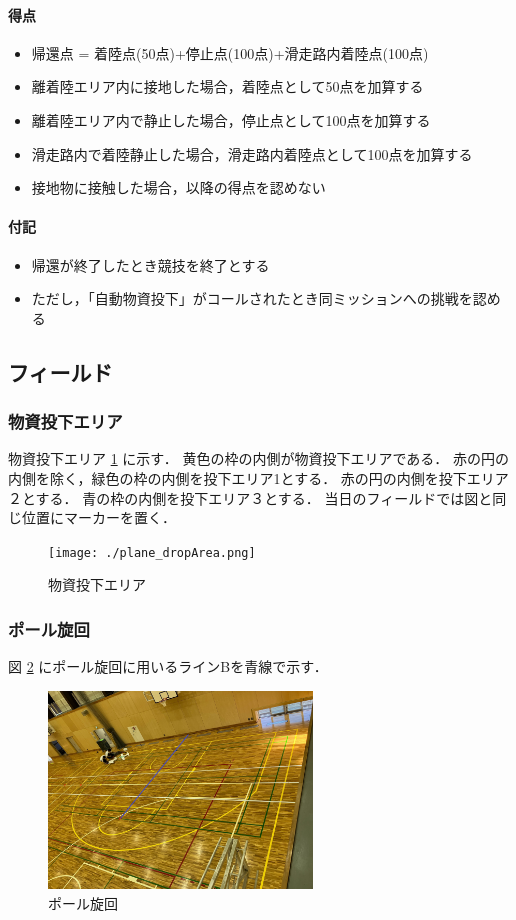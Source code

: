 \paragraph{得点}
\begin{itemize}
\item 帰還点 = 着陸点(50点)+停止点(100点)+滑走路内着陸点(100点)
\item 離着陸エリア内に接地した場合，着陸点として50点を加算する
\item 離着陸エリア内で静止した場合，停止点として100点を加算する
\item 滑走路内で着陸静止した場合，滑走路内着陸点として100点を加算する
\item 接地物に接触した場合，以降の得点を認めない
\end{itemize}
\paragraph{付記}
\begin{itemize}
\item 帰還が終了したとき競技を終了とする
\item ただし，「自動物資投下」がコールされたとき同ミッションへの挑戦を認める
\end{itemize}

\subsection{フィールド}
\subsubsection{物資投下エリア}
物資投下エリア \ref{fig::plane::dropArea} に示す．
黄色の枠の内側が物資投下エリアである．
赤の円の内側を除く，緑色の枠の内側を投下エリア1とする．
赤の円の内側を投下エリア２とする．
青の枠の内側を投下エリア３とする．
当日のフィールドでは図と同じ位置にマーカーを置く．

\begin{figure}[bh]
  \centering\texttt{[image: ./plane\_dropArea.png]}
  \caption{物資投下エリア}
  \label{fig::plane::dropArea}
\end{figure}

\subsubsection{ポール旋回}
図 \ref{fig::plane::poleTurn} にポール旋回に用いるラインBを青線で示す．
\begin{figure}[h]
  \centering\includegraphics[width=70mm]{plane_poleTurn.jpg}
  \caption{ポール旋回}
  \label{fig::plane::poleTurn}
\end{figure}

